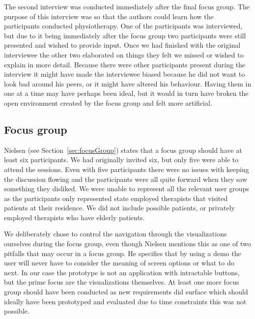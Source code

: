 The second interview was conducted immediately after the final focus group. The purpose of this interview was so that the authors could learn how the participants conducted physiotherapy. One of the participants was interviewed, but due to it being immediately after the focus group two participants were still presented and wished to provide input. Once we had finished with the original interviewee the other two elaborated on things they felt we missed or wished to explain in more detail. Because there were other participants present during the interview it might have made the interviewee biased because he did not want to look bad around his peers, or it might have altered his behaviour. Having them in one at a time may have perhaps been ideal, but it would in turn have broken the open environment created by the focus group and felt more artificial.

\subsection{Focus group}
Nielsen (see Section~\ref{sec:focusGroup}) states that a focus group should have at least six participants. We had originally invited six, but only five were able to attend the sessions. Even with five participants there were no issues with keeping the discussion flowing and the participants were all quite forward when they saw something they disliked. We were unable to represent all the relevant user groups as the participants only represented state employed therapists that visited patients at their residence. We did not include possible patients, or privately employed therapists who have elderly patients.

We deliberately chose to control the navigation through the visualizations ourselves during the focus group, even though Nielsen mentions this as one of two pitfalls that may occur in a focus group. He specifies that by using a demo the user will never have to consider the meaning of screen options or what to do next. In our case the prototype is not an application with intractable buttons, but the prime focus are the visualizations themselves. At least one more focus group should have been conducted as new requirements did surface which should ideally have been prototyped and evaluated due to time constraints this was not possible.

